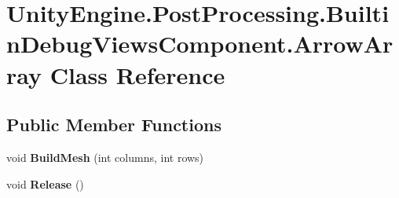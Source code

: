 \hypertarget{class_unity_engine_1_1_post_processing_1_1_builtin_debug_views_component_1_1_arrow_array}{}\section{Unity\+Engine.\+Post\+Processing.\+Builtin\+Debug\+Views\+Component.\+Arrow\+Array Class Reference}
\label{class_unity_engine_1_1_post_processing_1_1_builtin_debug_views_component_1_1_arrow_array}
\subsection*{Public Member Functions}
\begin{DoxyCompactItemize}
\item 
\mbox{\label{class_unity_engine_1_1_post_processing_1_1_builtin_debug_views_component_1_1_arrow_array_af49adaed74dae822a3f58a975898341f}} 
void {\bfseries Build\+Mesh} (int columns, int rows)
\item 
\mbox{\label{class_unity_engine_1_1_post_processing_1_1_builtin_debug_views_component_1_1_arrow_array_a58ac3d4a71fb0d5ffa9aaf1377de3b06}} 
void {\bfseries Release} ()
\end{DoxyCompactItemize}
